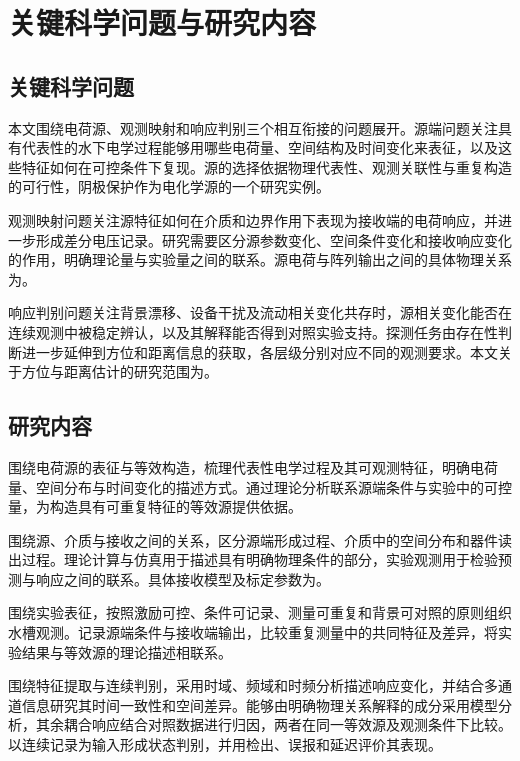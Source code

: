 \section{关键科学问题与研究内容}
\subsection{关键科学问题}

本文围绕电荷源、观测映射和响应判别三个相互衔接的问题展开。源端问题关注具有代表性的水下电学过程能够用哪些电荷量、空间结构及时间变化来表征，以及这些特征如何在可控条件下复现。源的选择依据物理代表性、观测关联性与重复构造的可行性，阴极保护作为电化学源的一个研究实例。

观测映射问题关注源特征如何在介质和边界作用下表现为接收端的电荷响应，并进一步形成差分电压记录。研究需要区分源参数变化、空间条件变化和接收响应变化的作用，明确理论量与实验量之间的联系。源电荷与阵列输出之间的具体物理关系为\underline{\hspace{6em}}。

响应判别问题关注背景漂移、设备干扰及流动相关变化共存时，源相关变化能否在连续观测中被稳定辨认，以及其解释能否得到对照实验支持。探测任务由存在性判断进一步延伸到方位和距离信息的获取，各层级分别对应不同的观测要求。本文关于方位与距离估计的研究范围为\underline{\hspace{6em}}。

\subsection{研究内容}

围绕电荷源的表征与等效构造，梳理代表性电学过程及其可观测特征，明确电荷量、空间分布与时间变化的描述方式。通过理论分析联系源端条件与实验中的可控量，为构造具有可重复特征的等效源提供依据。

围绕源、介质与接收之间的关系，区分源端形成过程、介质中的空间分布和器件读出过程。理论计算与仿真用于描述具有明确物理条件的部分，实验观测用于检验预测与响应之间的联系。具体接收模型及标定参数为\underline{\hspace{6em}}。

围绕实验表征，按照激励可控、条件可记录、测量可重复和背景可对照的原则组织水槽观测。记录源端条件与接收端输出，比较重复测量中的共同特征及差异，将实验结果与等效源的理论描述相联系。

围绕特征提取与连续判别，采用时域、频域和时频分析描述响应变化，并结合多通道信息研究其时间一致性和空间差异。能够由明确物理关系解释的成分采用模型分析，其余耦合响应结合对照数据进行归因，两者在同一等效源及观测条件下比较。以连续记录为输入形成状态判别，并用检出、误报和延迟评价其表现。

